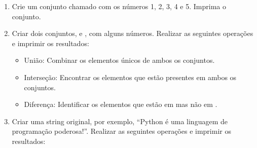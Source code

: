 \documentclass[letterpaper,10pt,english]{jupyterBook}
\begin{document}
\begin{sphinxVerbatim}[commandchars=\\\{\}]
       
      
        

           
\end{sphinxVerbatim}
\begin{enumerate}
%
\setcounter{enumi}{7}
\item {} 
\sphinxAtStartPar
Crie um conjunto chamado  com os números 1, 2, 3, 4 e 5. Imprima o conjunto.

\item {} 
\sphinxAtStartPar
Criar dois conjuntos,  e , com alguns números. Realizar as seguintes operações e imprimir os resultados:
\begin{itemize}
\item {} 
\sphinxAtStartPar
União: Combinar os elementos únicos de ambos os conjuntos.

\item {} 
\sphinxAtStartPar
Interseção: Encontrar os elementos que estão presentes em ambos os conjuntos.

\item {} 
\sphinxAtStartPar
Diferença: Identificar os elementos que estão em  mas não em .

\end{itemize}

\item {} 
\sphinxAtStartPar
Criar uma string original, por exemplo, “Python é uma linguagem de programação poderosa!”. Realizar as seguintes operações e imprimir os resultados:

\end{enumerate}
\end{document}

